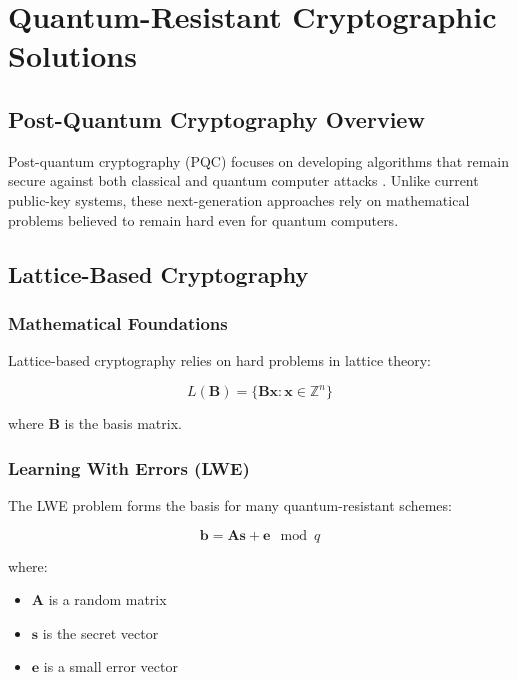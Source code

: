 \chapter{Quantum-Resistant Cryptographic Solutions}\label{chap:quantum_resistant}

\section{Post-Quantum Cryptography Overview}
Post-quantum cryptography (PQC) focuses on developing algorithms that remain secure against both classical and quantum computer attacks \parencite{bernstein2017post}. Unlike current public-key systems, these next-generation approaches rely on mathematical problems believed to remain hard even for quantum computers.

\section{Lattice-Based Cryptography}\label{sec:lattice}

\subsection{Mathematical Foundations}\label{subsec:lattice_math}
Lattice-based cryptography relies on hard problems in lattice theory:

\begin{equation}\label{eq:lattice}
    L(\mathbf{B}) = \{\mathbf{Bx} : \mathbf{x} \in \mathbb{Z}^n\}
\end{equation}

where $\mathbf{B}$ is the basis matrix.

\subsection{Learning With Errors (LWE)}\label{subsec:lwe}
The LWE problem forms the basis for many quantum-resistant schemes:

\begin{equation}\label{eq:lwe}
    \mathbf{b} = \mathbf{As} + \mathbf{e} \mod q
\end{equation}

where:
\begin{itemize}
    \item $\mathbf{A}$ is a random matrix
    \item $\mathbf{s}$ is the secret vector
    \item $\mathbf{e}$ is a small error vector
\end{itemize}

